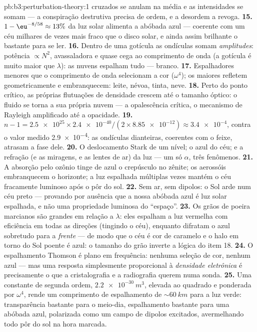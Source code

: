 \begin{solution}{pb:b3:perturbation-theory:1}
cruzados se anulam na média e as intensidades se somam --- a conspiração
destrutiva precisa de ordem, e a desordem a revoga.
\textbf{15.} $1 - \eu^{-8/58} \approx 13\%$ da luz solar alimenta a
abóbada azul --- coerente com um céu milhares de vezes mais fraco que o
disco solar, e ainda assim brilhante o bastante para se ler.
\textbf{16.} Dentro de uma gotícula as ondículas somam
\emph{amplitudes}: potência $\propto N^2$, avassaladora e quase cega ao
comprimento de onda (a gotícula é muito maior que $\lambda$): as nuvens
espalham tudo --- branco.
\textbf{17.} Espalhadores menores que o comprimento de onda selecionam
a cor ($\omega^4$); os maiores refletem geometricamente e embranquecem:
leite, névoa, tinta, neve.
\textbf{18.} Perto do ponto crítico, as próprias flutuações de
densidade crescem até o tamanho óptico: o fluido se torna a sua própria
nuvem --- a opalescência crítica, o mecanismo de Rayleigh amplificado
até a opacidade.
\textbf{19.} $n - 1 = \num{2.5e25} \times \num{2.4e-40}/(2 \times
\num{8.85e-12}) \approx \num{3.4e-4}$, contra o valor medido
\num{2.9e-4}: as ondículas dianteiras, coerentes com o feixe, atrasam a
fase dele.
\textbf{20.} O deslocamento Stark de um nível; o azul do céu; e a
refração (e as miragens, e as lentes de ar) da luz --- um só $\alpha$,
três fenômenos.
\textbf{21.} A absorção pelo ozônio tinge de azul o crepúsculo no
zênite; os aerossóis embranquecem o horizonte; a luz espalhada
múltiplas vezes mantém o céu fracamente luminoso após o pôr do sol.
\textbf{22.} Sem ar, sem dipolos: o Sol arde num céu preto --- provando
por ausência que a nossa abóbada azul é luz solar espalhada, e não uma
propriedade luminosa do ``espaço''.
\textbf{23.} Os grãos de poeira marcianos são grandes em relação a
$\lambda$: eles espalham a luz vermelha com eficiência em todas as
direções (tingindo o céu), enquanto difratam o azul sobretudo para a
\emph{frente} --- de modo que o céu é cor de caramelo e o halo em torno
do Sol poente é azul: o tamanho do grão inverte a lógica do item 18.
\textbf{24.} O espalhamento Thomson é plano em frequência: nenhuma
seleção de cor, nenhum azul --- mas uma resposta simplesmente
proporcional à \emph{densidade eletrônica} é precisamente o que a
cristalografia e a radiografia querem numa sonda.
\textbf{25.} Uma constante de segunda ordem, $\qty{2.2e-30}{m^3}$,
elevada ao quadrado e ponderada por $\omega^4$, rende um comprimento de
espalhamento de $\sim\qty{60}{km}$ para a luz verde: transparência
bastante para o meio-dia, espalhamento bastante para uma abóbada azul,
polarizada como um campo de dipolos excitados, avermelhando todo pôr do
sol na hora marcada.
\end{solution}
